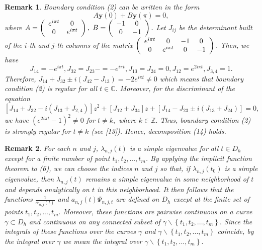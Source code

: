 \documentclass{article}%
\newtheorem{remark}{Remark}
\begin{document}
\begin{remark}
Boundary condition (2) can be written in the form
\[
A\mathbf{y}(0)+B\mathbf{y}(\pi)=0,
\]
where $A=\left(
\begin{array}
[c]{cc}%
e^{i\pi t} & 0\\
0 & e^{i\pi t}%
\end{array}
\right)  ,$ $B=\left(
\begin{array}
[c]{cc}%
-1 & 0\\
0 & -1
\end{array}
\right)  .$ Let $J_{ij}$ be the determinant built of the $i$-th and $j$-th
columns of the matrix $\left(
\begin{array}
[c]{cccc}%
e^{i\pi t} & 0 & -1 & 0\\
0 & e^{i\pi t} & 0 & -1
\end{array}
\right)  .$ Then, we have
\[
J_{14}=-e^{i\pi t},J_{32}=J_{23}-=-e^{i\pi t},J_{13}=J_{24}=0,J_{12}=e^{2i\pi
t},J_{3,4}=1.
\]
Therefore, $J_{14}+J_{32}\pm i(J_{42}-J_{13})=-2e^{i\pi t}\neq0$ which means
that boundary condition (2) is regular for all $t\in\mathbb{C}.$ Moreover, for
the discriminant of the equation
\[
\left[  J_{14}+J_{32}-i(J_{13}+J_{2,4})\right]  z^{2}+\left[  J_{12}%
+J_{34}\right]  z+\left[  J_{14}-J_{23}\pm i(J_{13}+J_{24})\right]  =0,
\]
we have $(e^{2i\pi t}-1)^{2}\neq0$ for $t\neq k,$ where $k\in\mathbb{Z}.$
Thus, boundary condition (2) is strongly regular for $t\neq k$ (see [13]).
Hence, decomposition (14) holds.
\end{remark}

\begin{remark}
For each $n$ and $j$, $\lambda_{n,j}(t)$ is a simple eigenvalue for all $t\in
D_{h}$ except for a finite number of point $t_{1},t_{2},...,t_{m}$. By
applying the implicit function theorem to (6), we can choose the indices $n$
and $j$ so that, if $\lambda_{n,j}(t_{0})$ is a simple eigenvalue, then
$\lambda_{n,j}(t)$ remains a simple eigenvalue in some neighborhood of $t$ and
depends analytically on $t$ in this neighborhood. It then follows that the
functions $\frac{1}{\alpha_{n,j}(t)}$ and $a_{n,j}(t)\Psi_{n,j,t}$ are defined
on $D_{h}$ except at the finite set of points $t_{1},t_{2},...,t_{m}.$
Moreover, these functions are pairwise continuous on a curve $\gamma\subset
D_{h}$ and continuous on any connected subset of $\gamma\backslash\left\{
t_{1},t_{2},...,t_{m}\right\}  .$ Since the integrals of these functions over
the curves $\gamma$ and $\gamma\backslash\left\{  t_{1},t_{2},...,t_{m}%
\right\}  $ coincide, by the integral over $\gamma$ we mean the integral over
$\gamma\backslash\left\{  t_{1},t_{2},...,t_{m}\right\}  .$
\end{remark}
\end{document}

